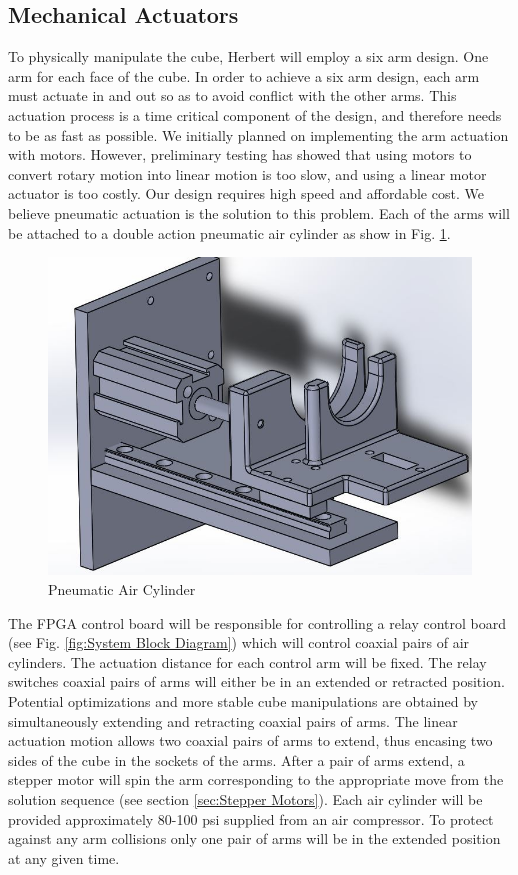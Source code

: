 \documentclass[11pt,english]{article}
\begin{document}
\subsection{Mechanical Actuators}
\label{sec:Mechanical Actuators}
To physically manipulate the cube, Herbert will employ a six arm design. One arm for each face of the cube. In order to achieve a six arm design, each arm must actuate in and out so as to avoid conflict
with the other arms. This actuation process is a time critical component of
the design, and therefore needs to be as fast as possible.  We initially planned on implementing the
arm actuation with motors.  However, preliminary testing has showed that using
motors to convert rotary motion into linear motion is too slow, and using a linear motor
actuator is too costly. Our design requires high speed and affordable cost. We believe pneumatic actuation is the solution to this problem.  Each of the arms will be attached to a double action pneumatic air cylinder as show in Fig. \ref{fig:Pneumatic Air Cylinder}.

\begin{figure}[!ht]
\centering
\includegraphics[scale=0.5]{AirCylinder.jpg}
\caption{Pneumatic Air Cylinder}
\label{fig:Pneumatic Air Cylinder}
\end{figure}

The FPGA control board will be responsible for controlling a relay control board (see Fig. \ref{fig:System Block Diagram}) which will control coaxial pairs of air cylinders. The actuation distance for each control arm will be fixed. The relay switches coaxial pairs of arms will either be in an extended or retracted position. Potential optimizations and more stable cube manipulations  are obtained by simultaneously extending and retracting coaxial pairs of arms. The linear actuation motion allows two coaxial pairs of
arms to extend, thus encasing two sides of the cube in the sockets of the arms. After a pair of arms extend,
a stepper motor will spin the arm corresponding to the appropriate move from the solution sequence (see section \ref{sec:Stepper Motors}). Each air cylinder will be provided approximately 80-100 psi supplied from an air compressor. To protect against any
arm collisions only one pair of arms will be in the extended position at any given time.
\end{document}
